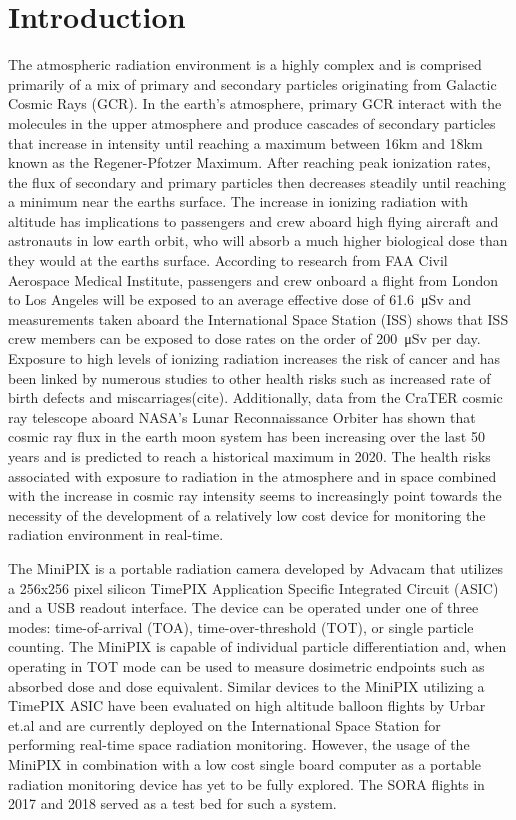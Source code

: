 \section{Introduction}
\label{Introduction}
The atmospheric radiation environment is a highly complex and is comprised primarily of a mix of primary and secondary particles originating from Galactic Cosmic Rays (GCR). In the earth’s atmosphere, primary GCR interact with the molecules in the upper atmosphere and produce cascades of secondary particles that increase in intensity until reaching a maximum between 16km and 18km known as the Regener-Pfotzer Maximum. After reaching peak ionization rates, the flux of secondary and primary particles then decreases steadily until reaching a minimum near the earths surface. The increase in ionizing radiation with altitude has implications to passengers and crew aboard high flying aircraft and astronauts in low earth orbit, who will absorb a much higher biological dose than they would at the earths surface. According to research from FAA Civil Aerospace Medical Institute, passengers and crew onboard a flight from London to Los Angeles will be exposed to an average effective dose of \SI{61.6}{\micro\sievert}\cite{faa} and measurements taken aboard the International Space Station (ISS) shows that ISS crew members can be exposed to dose rates on the order of \SI{200}{\micro\sievert} per day. Exposure to high levels of ionizing radiation increases the risk of cancer and has been linked by numerous studies to other health risks such as increased rate of birth defects and miscarriages(cite). Additionally, data from the CraTER cosmic ray telescope aboard NASA’s Lunar Reconnaissance Orbiter has shown that cosmic ray flux in the earth moon system has been increasing over the last 50 years and is predicted to reach a historical maximum in 2020\cite{crater}. The health risks associated with exposure to radiation in the atmosphere and in space combined with the increase in cosmic ray intensity seems to increasingly point towards the necessity of the development of a relatively low cost device for monitoring the radiation environment in real-time.

The MiniPIX is a portable radiation camera developed by Advacam that utilizes a 256x256 pixel silicon TimePIX Application Specific Integrated Circuit (ASIC) and a USB readout interface. The device can be operated under one of three modes: time-of-arrival (TOA), time-over-threshold (TOT), or single particle counting. The MiniPIX is capable of individual particle differentiation and, when operating in TOT mode can be used to measure dosimetric endpoints such as absorbed dose and dose equivalent. Similar devices to the MiniPIX utilizing a TimePIX ASIC have been evaluated on high altitude balloon flights by Urbar et.al\cite{bexus} and are currently deployed on the International Space Station for performing real-time space radiation monitoring\cite{timepixiss}. However, the usage of the MiniPIX in combination with a low cost single board computer as a portable radiation monitoring device has yet to be fully explored. The SORA flights in 2017 and 2018 served as a test bed for such a system.

